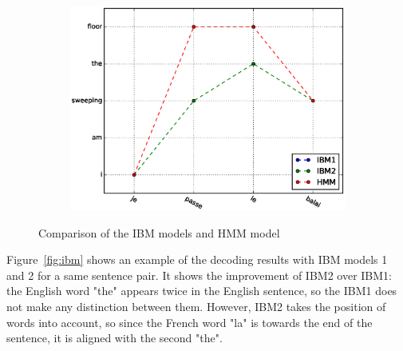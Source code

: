 \documentclass[final]{beamer}
\begin{document}
\begin{frame}[t]
\begin{multicols}{3}
\begin{figure}
\begin{subfigure}{.80\columnwidth}
  \centering
  \includegraphics[width=.99\linewidth]{figures/figures_final/sentence11.eps}
\end{subfigure}%
\caption{Comparison of the IBM models and HMM model }
\label{fig:hmm}
\end{figure}


Figure~\ref{fig:ibm} shows an example of the decoding results with IBM models 1 and 2 for a same sentence pair. It shows the improvement of IBM2 over IBM1: the English word "the" appears twice in the English sentence, so the IBM1 does not make any distinction between them. However, IBM2 takes the position of words into account, so since the French word "la" is towards the end of the sentence, it is aligned with the second "the".


\end{multicols}
\end{frame}
\end{document}
